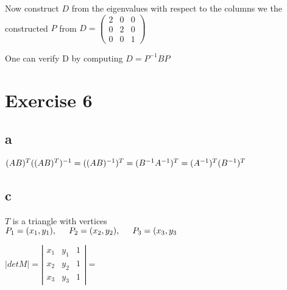 \documentclass{article}
\begin{document}
Now construct $D$ from the eigenvalues with respect to the columns we the constructed $P$ from
$D=
\left (
    \begin{matrix}
        2 & 0 & 0\\
        0 & 2 & 0\\
        0 & 0 & 1
    \end{matrix}
\right )
$

One can verify D by computing $D = P^{-1}BP$

\newpage
\section*{Exercise 6}

\subsection*{a}
$
(AB)^{T}\\
((AB)^{T})^{-1} = \\
((AB)^{-1})^{T} = \\
(B^{-1}A^{-1})^{T} = \\
(A^{-1})^{T}(B^{-1})^{T}
$

\subsection*{c}

$T$ is a triangle with vertices\\
$P_{1} = (x_{1}, y_{1}), \hspace{5 mm}
P_{2} = (x_{2}, y_{2}), \hspace{5 mm}
P_{3} = (x_{3}, y_{3}
$

$|detM| =
\left |
	\begin{matrix}
		x_{1} & y_{1} & 1\\
		x_{2} & y_{2} & 1\\
		x_{3} & y_{3} & 1
	\end{matrix}
\right |
=
$
\end{document}
